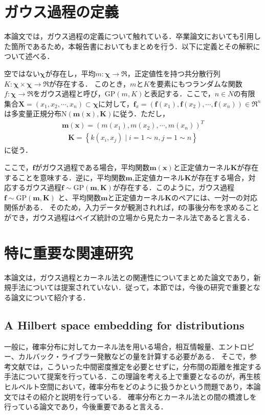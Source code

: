 \documentclass[10pt,onecolumn]{jsarticle}
\begin{document}
\section{ガウス過程の定義}
本論文では，ガウス過程の定義について触れている．卒業論文においても引用した箇所であるため，本報告書においてもまとめを行う．以下に定義とその解釈について述べる．

空ではない$\bm{\chi}$が存在し，平均$m: \bm{\chi} \to \Re $，正定値性を持つ共分散行列$K:\bm{\chi}\times \bm{\chi}\to \Re$が存在する．
このとき，$m$と$K$を要素にもつランダムな関数$f:\bm{\chi} \to  \Re$をガウス過程と呼び，$\text{GP}(m,K)$と表記する．ここで，$n\in N$の有限集合$\bm{X} = (x_1,x_2,\cdots,x_n) \subset \bm{\chi}$に対して，$\bm{f}_x = \left( \bm{f}(x_1),\bm{f}(x_2),\cdots,\bm{f}(x_n)\right) \in \Re^{n}$
は多変量正規分布$\text{N}(\bm{m}(\bm{x}),\bm{K})$に従う．ただし，
\begin{align}
	\bm{m}(\bm{x}) = \left( m(x_1),m(x_2),\cdots, m(x_n)\right)^T
\end{align}
\begin{align}
	\bm{K} = \left\{k(x_i,x_j) \mid i = 1\sim n,j=1\sim n \right\}
\end{align}
に従う．

ここで，$\bm{f}$がガウス過程である場合，平均関数$\bm{m(x)}$と正定値カーネル$\bm{K}$が存在することを意味する．逆に，平均関数$\bm{m}$,正定値カーネル$\bm{K}$が存在する場合，対応するガウス過程$\bm{f}\sim \text{GP}(\bm{m},\bm{K})$が存在する．このように，ガウス過程$\bm{f}\sim \text{GP}(\bm{m},\bm{K})$
と、平均関数$\bm{m}$と正定値カーネル$\bm{K}$のペアには、一対一の対応関係がある．
そのため，入力データが観測されれば，$\bm{f}$の事後分布を求めることができ，ガウス過程はベイズ統計の立場から見たカーネル法であると言える．

\section{特に重要な関連研究}
本論文は，ガウス過程とカーネル法との関連性についてまとめた論文であり，新規手法については提案されていない．従って，本節では，今後の研究で重要となる論文について紹介する．

\subsection{A Hilbert space embedding for distributions}
一般に，確率分布に対してカーネル法を用いる場合，相互情報量、エントロピー、カルバック・ライブラー発散などの量を計算する必要がある．
そこで，参考文献\cite{ref1}では，こういった中間密度推定を必要とせずに，分布間の距離を推定する手法について提案を行っている．この理論を考える上で重要となるのが，再生核ヒルベルト空間において，確率分布をどのように扱うかという問題であり，本論文ではその紹介と説明を行っている．
確率分布とカーネル法との間の橋渡しを行っている論文であり，今後重要であると言える．
\end{document}
